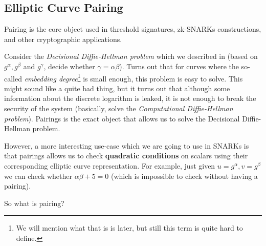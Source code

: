 \documentclass[../lecture-notes-148x210.tex]{subfiles}
\begin{document}
\subsection{Elliptic Curve Pairing}\label{section:ecpairing}

Pairing \cite[section 15]{Dan_Boneh_2023} \cite[section 26]{Galbraith_2012} \cite[section 16]{Cohen_Frey_2005} is the 
core object used in threshold signatures, zk-SNARKs constructions, and other cryptographic applications. 

Consider the \textit{Decisional Diffie-Hellman problem} which we described in  
(based on $g^{\alpha},g^{\beta}$ and $g^{\gamma}$, decide whether $\gamma = \alpha\beta$). Turns out that for curves 
where the so-called \textit{embedding degree}\footnote{We will mention what that is is later, but still this term is 
quite hard to define.} is small enough, this problem is easy to solve. This might sound like a quite bad thing, but 
it turns out that although some information about the discrete logarithm is leaked, it is not enough to break the 
security of the system (basically, solve the \textit{Computational Diffie-Hellman problem}). Pairings is the exact 
object that allows us to solve the Decisional Diffie-Hellman problem.

However, a more interesting use-case which we are going to use in SNARKs is that pairings allows us to check 
\textbf{quadratic conditions} on scalars using their corresponding elliptic curve representation. For example, 
just given $u=g^{\alpha},v=g^{\beta}$ we can check whether $\alpha\beta+5=0$ (which is impossible to check without 
having a pairing). 

So what is pairing?
\end{document}
